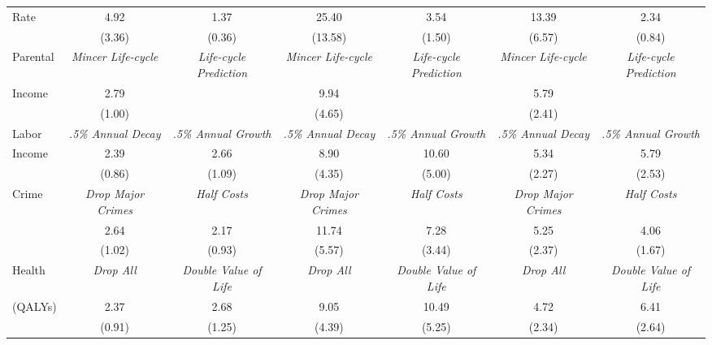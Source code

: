 \begin{tabular}{lcccccc}
Rate	&	4.92	&	1.37	&	25.40	&	3.54	&	13.39	&	2.34	\\
	&	(3.36)	&	(0.36)	&	(13.58)	&	(1.50)	&	(6.57)	&	(0.84)	\\ \midrule
Parental	&	\textit{Mincer Life-cycle}	&	\textit{Life-cycle Prediction}	&	\textit{Mincer Life-cycle}	&	\textit{Life-cycle Prediction}	&	\textit{Mincer Life-cycle}	&	\textit{Life-cycle Prediction}	\\
Income	&	2.79	&		&	9.94	&		&	5.79	&		\\
	&	(1.00)	&		&	(4.65)	&		&	(2.41)	&		\\ \midrule
Labor	&	\textit{.5\% Annual Decay}	&	\textit{.5\% Annual Growth}	&	\textit{.5\% Annual Decay}	&	\textit{.5\% Annual Growth}	&	\textit{.5\% Annual Decay}	&	\textit{.5\% Annual Growth}	\\
Income	&	2.39	&	2.66	&	8.90	&	10.60	&	5.34	&	5.79	\\
	&	(0.86)	&	(1.09)	&	(4.35)	&	(5.00)	&	(2.27)	&	(2.53)	\\ \midrule
Crime	&	\textit{Drop Major Crimes}	&	\textit{Half Costs}	&	\textit{Drop Major Crimes}	&	\textit{Half Costs}	&	\textit{Drop Major Crimes}	&	\textit{Half Costs}	\\
	&	2.64	&	2.17	&	11.74	&	7.28	&	5.25	&	4.06	\\
	&	(1.02)	&	(0.93)	&	(5.57)	&	(3.44)	&	(2.37)	&	(1.67)	\\ \midrule
Health	&	\textit{Drop All}	&	\textit{Double Value of Life}	&	\textit{Drop All}	&	\textit{Double Value of Life}	&	\textit{Drop All}	&	\textit{Double Value of Life}	\\
(QALYs)	&	2.37	&	2.68	&	9.05	&	10.49	&	4.72	&	6.41	\\
	&	(0.91)	&	(1.25)	&	(4.39)	&	(5.25)	&	(2.34)	&	(2.64)	\\ \bottomrule
\end{tabular}